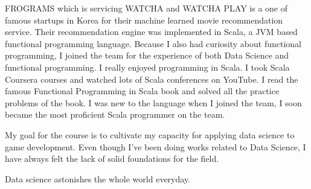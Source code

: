 \documentclass[11pt]{article}
\begin{document}
FROGRAMS which is servicing WATCHA and WATCHA PLAY is a one of famous startups in Korea for their machine learned movie recommendation service.
Their recommendation engine was implemented in Scala, a JVM based functional programming language.
Because I also had curiosity about functional programming, I joined the team for the experience of both Data Science and functional programming.
I really enjoyed programming in Scala.
I took Scala Coursera courses and watched lots of Scala conferences on YouTube.
I read the famous Functional Programming in Scala book and solved all the practice problems of the book.
I was new to the language when I joined the team, I soon became the most proficient Scala programmer on the team.

My goal for the course is to cultivate my capacity for applying data science to game development.
Even though I've been doing works related to Data Science, I have always felt the lack of solid foundations for the field.

Data science astonishes the whole world everyday.
\end{document}
